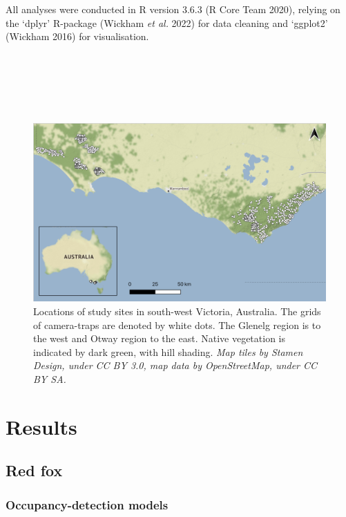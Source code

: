 \documentclass[11pt,a4paper,titlepage,twoside,openright]{style/unimelbthesis}
\begin{document}
\begin{mainmatter}
All analyses were conducted in R version 3.6.3 (R Core Team 2020), relying on the `dplyr' R-package (Wickham \emph{et al.} 2022) for data cleaning and `ggplot2' (Wickham 2016) for visualisation.

\newpage

\(~\)

\(~\)

\(~\)
\begin{figure}

{\centering \includegraphics[width=1\linewidth]{figure/map_cams} 

}

\caption{Locations of study sites in south-west Victoria, Australia. The grids of camera-traps are denoted by white dots. The Glenelg region is to the west and Otway region to the east. Native vegetation is indicated by dark green, with hill shading. \textit{Map tiles by Stamen Design, under CC BY 3.0, map data by OpenStreetMap, under CC BY SA.}}\label{fig:occ-map}
\end{figure}
\newpage

\hypertarget{results-1}{%
\section{Results}\label{results-1}}

\hypertarget{red-fox-1}{%
\subsection{Red fox}\label{red-fox-1}}

\hypertarget{occupancy-detection-models-1}{%
\subsubsection{Occupancy-detection models}\label{occupancy-detection-models-1}}


\end{mainmatter}
\end{document}
